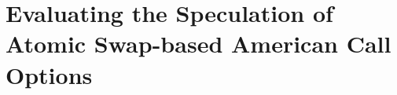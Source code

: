 \section{Evaluating the Speculation of Atomic Swap-based American Call Options}
\label{sec:evaluation}